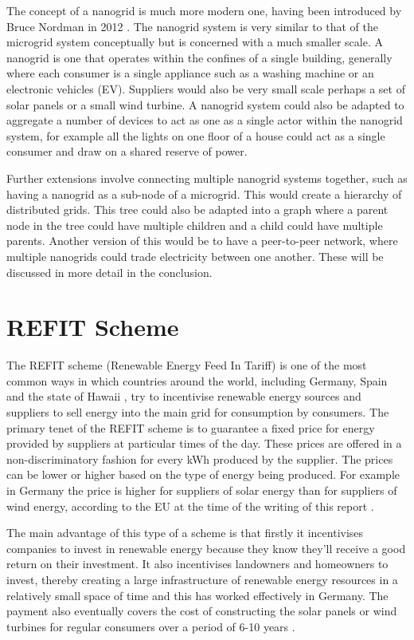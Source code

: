 \documentclass[a4paper, notitlepage]{report}
\begin{document}
The concept of a nanogrid is much more modern one, having been introduced
by Bruce Nordman in 2012 \cite{nordman2012think}. The nanogrid system is very
similar to that of the microgrid system conceptually but is concerned with a
much smaller scale. A nanogrid is one that operates within the confines of a
single building, generally where each consumer is a single appliance such as a
washing machine or an electronic vehicles (EV). Suppliers would also be very
small scale perhaps a set of solar panels or a small wind turbine. A nanogrid
system could also be adapted to aggregate a number of devices to act as one as a
single actor within the nanogrid system, for example all the lights on one floor
of a house could act as a single consumer and draw on a shared reserve of power.

Further extensions involve connecting multiple nanogrid systems together, such
as having a nanogrid as a sub-node of a microgrid. This would create a hierarchy
of distributed grids. This tree could also be adapted into a graph where a
parent node in the tree could have multiple children and a child could have
multiple parents. Another version of this would be to have a peer-to-peer
network, where multiple nanogrids could trade electricity between one another.
These will be discussed in more detail in the conclusion.
\chapter{REFIT Scheme}
\label{sec:org194ce61}
The REFIT scheme (Renewable Energy Feed In Tariff) \cite{lauber2004refit} is one of the most common
ways in which countries around the world, including Germany, Spain and the state
of Hawaii \cite{couture2010analysis}, try to incentivise renewable energy sources
and suppliers to sell energy into the main grid for consumption by consumers.
The primary tenet of the REFIT scheme is to guarantee a fixed price for energy
provided by suppliers at particular times of the day. These prices are offered
in a non-discriminatory fashion for every kWh produced by the supplier. The
prices can be lower or higher based on the type of energy being produced. For
example in Germany the price is higher for suppliers of solar energy than for
suppliers of wind energy, according to the EU at the time of the writing of this
report \cite{refit_germany}.

The main advantage of this type of a scheme is that firstly it incentivises
companies to invest in renewable energy because they know they’ll receive a good
return on their investment. It also incentivises landowners and homeowners to
invest, thereby creating a large infrastructure of renewable energy resources in
a relatively small space of time and this has worked effectively in Germany. The
payment also eventually covers the cost of constructing the solar panels or wind
turbines for regular consumers over a period of 6-10 years \cite{lauber2004refit}. 
\end{document}
